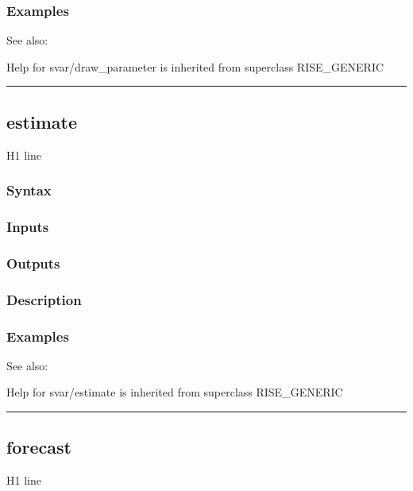 \documentclass[letterpaper,10pt,english]{sphinxmanual}
\begin{document}
\subsubsection{Examples}
\label{classes/models/@svar/svar:id7}
See also:

Help for svar/draw\_parameter is inherited from superclass RISE\_GENERIC


\bigskip\hrule{}\bigskip



\subsection{estimate}
\label{classes/models/@svar/svar:estimate}\label{classes/models/@svar/svar:id8}
H1 line


\subsubsection{Syntax}
\label{classes/models/@svar/svar:id9}

\subsubsection{Inputs}
\label{classes/models/@svar/svar:id10}

\subsubsection{Outputs}
\label{classes/models/@svar/svar:id11}

\subsubsection{Description}
\label{classes/models/@svar/svar:id12}

\subsubsection{Examples}
\label{classes/models/@svar/svar:id13}
See also:

Help for svar/estimate is inherited from superclass RISE\_GENERIC


\bigskip\hrule{}\bigskip



\subsection{forecast}
\label{classes/models/@svar/svar:id14}\label{classes/models/@svar/svar:forecast}
H1 line
\end{document}
